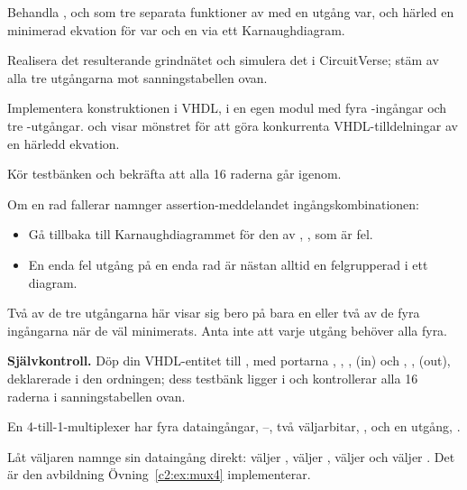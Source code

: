  Behandla ,  och  som tre separata funktioner av  med
en utgång var, och härled en minimerad ekvation för var och en via ett Karnaughdiagram.

 Realisera det resulterande grindnätet och simulera det i CircuitVerse; stäm av alla tre
utgångarna mot sanningstabellen ovan.

 Implementera konstruktionen i VHDL, i en egen modul med fyra -ingångar
och tre -utgångar.  och  visar mönstret
för att göra konkurrenta VHDL-tilldelningar av en härledd ekvation.

 Kör testbänken och bekräfta att alla 16 raderna går igenom.

Om en rad fallerar namnger assertion-meddelandet ingångskombinationen:
\begin{itemize}
  \item Gå tillbaka till Karnaughdiagrammet för den av , ,  som är fel.
  \item En enda fel utgång på en enda rad är nästan alltid en felgrupperad  i ett diagram.
\end{itemize}

\note[Tips]Två av de tre utgångarna här visar sig bero på bara en eller två av de fyra ingångarna
när de väl minimerats. Anta inte att varje utgång behöver alla fyra.


\begin{selfcheck}
\textbf{Självkontroll.} Döp din VHDL-entitet till , med portarna ,
, ,  (in) och , ,  (out), deklarerade i den
ordningen; dess testbänk ligger i  och kontrollerar alla 16 raderna i
sanningstabellen ovan.
\end{selfcheck}


\label{c2:ex:mux4hand}
En 4-till-1-multiplexer har fyra dataingångar, --, två väljarbitar, ,
och en utgång, .

Låt väljaren namnge sin dataingång direkt:  väljer ,  väljer
,  väljer  och  väljer . Det är den avbildning
Övning~\ref{c2:ex:mux4} implementerar.

